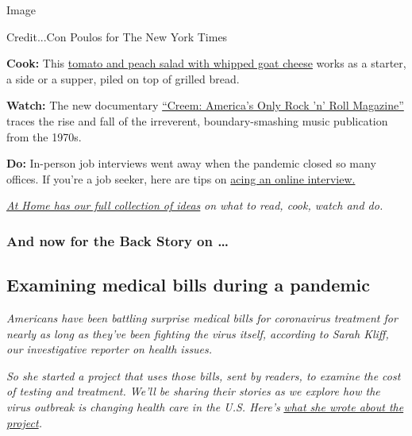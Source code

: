 Image

Credit...Con Poulos for The New York Times

\textbf{Cook:} This
\href{https://cooking.nytimes3xbfgragh.onion/recipes/1020367-tomato-and-peach-salad-with-whipped-goat-cheese}{tomato
and peach salad with whipped goat cheese} works as a starter, a side or
a supper, piled on top of grilled bread.

\textbf{Watch:} The new documentary
\href{https://www.nytimes3xbfgragh.onion/2020/08/03/arts/music/creem-magazine-documentary.html?action=click\&module=RelatedLinks\&pgtype=collection}{``Creem:
America's Only Rock 'n' Roll Magazine''} traces the rise and fall of the
irreverent, boundary-smashing music publication from the 1970s.

\textbf{Do:} In-person job interviews went away when the pandemic closed
so many offices. If you're a job seeker, here are tips on
\href{https://www.nytimes3xbfgragh.onion/2020/08/03/business/online-job-interview-tips.html}{acing
an online interview.}

\href{https://www.nytimes3xbfgragh.onion/spotlight/at-home}{\emph{At
Home has our full collection of ideas}} \emph{on what to read, cook,
watch and do.}

\hypertarget{and-now-for-the-back-story-on-}{%
\subsubsection{And now for the Back Story on
\ldots{}}\label{and-now-for-the-back-story-on-}}

\hypertarget{examining-medical-bills-during-a-pandemic}{%
\subsection{Examining medical bills during a
pandemic}\label{examining-medical-bills-during-a-pandemic}}

\emph{Americans have been battling surprise medical bills for
coronavirus treatment for nearly as long as they've been fighting the
virus itself, according to Sarah Kliff, our investigative reporter on
health issues.}

\emph{So she started a project that uses those bills, sent by readers,
to examine the cost of testing and treatment. We'll be sharing their
stories as we explore how the virus outbreak is changing health care in
the U.S. Here's}
\href{https://www.nytimes3xbfgragh.onion/2020/08/03/reader-center/coronavirus-medical-bills.html}{\emph{what
she wrote about the project}}\emph{.}

